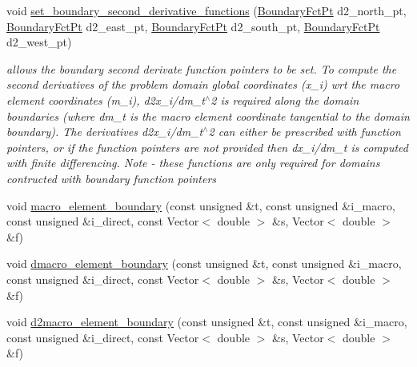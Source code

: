 \begin{DoxyCompactItemize}
void \hyperlink{classoomph_1_1TopologicallyRectangularDomain_a69d21da2d4dff225943aab99fb4f1f10}{set\+\_\+boundary\+\_\+second\+\_\+derivative\+\_\+functions} (\hyperlink{classoomph_1_1TopologicallyRectangularDomain_a8b2e24f5500d86c93aef509c5410e7cc}{Boundary\+Fct\+Pt} d2\+\_\+north\+\_\+pt, \hyperlink{classoomph_1_1TopologicallyRectangularDomain_a8b2e24f5500d86c93aef509c5410e7cc}{Boundary\+Fct\+Pt} d2\+\_\+east\+\_\+pt, \hyperlink{classoomph_1_1TopologicallyRectangularDomain_a8b2e24f5500d86c93aef509c5410e7cc}{Boundary\+Fct\+Pt} d2\+\_\+south\+\_\+pt, \hyperlink{classoomph_1_1TopologicallyRectangularDomain_a8b2e24f5500d86c93aef509c5410e7cc}{Boundary\+Fct\+Pt} d2\+\_\+west\+\_\+pt)
\begin{DoxyCompactList}\small\item\em allows the boundary second derivate function pointers to be set. To compute the second derivatives of the problem domain global coordinates (x\+\_\+i) wrt the macro element coordinates (m\+\_\+i), d2x\+\_\+i/dm\+\_\+t$^\wedge$2 is required along the domain boundaries (where dm\+\_\+t is the macro element coordinate tangential to the domain boundary). The derivatives d2x\+\_\+i/dm\+\_\+t$^\wedge$2 can either be prescribed with function pointers, or if the function pointers are not provided then dx\+\_\+i/dm\+\_\+t is computed with finite differencing. Note -\/ these functions are only required for domains contructed with boundary function pointers \end{DoxyCompactList}\item 
void \hyperlink{classoomph_1_1TopologicallyRectangularDomain_a4de4d505233303cee0690ee87e45b4cf}{macro\+\_\+element\+\_\+boundary} (const unsigned \&t, const unsigned \&i\+\_\+macro, const unsigned \&i\+\_\+direct, const Vector$<$ double $>$ \&s, Vector$<$ double $>$ \&f)
\item 
void \hyperlink{classoomph_1_1TopologicallyRectangularDomain_a218b22a016e2f330d6b90354597d9786}{dmacro\+\_\+element\+\_\+boundary} (const unsigned \&t, const unsigned \&i\+\_\+macro, const unsigned \&i\+\_\+direct, const Vector$<$ double $>$ \&s, Vector$<$ double $>$ \&f)
\item 
void \hyperlink{classoomph_1_1TopologicallyRectangularDomain_a0b882a9e660cab447c6be8cbeb8c9c18}{d2macro\+\_\+element\+\_\+boundary} (const unsigned \&t, const unsigned \&i\+\_\+macro, const unsigned \&i\+\_\+direct, const Vector$<$ double $>$ \&s, Vector$<$ double $>$ \&f)
\end{DoxyCompactItemize}
